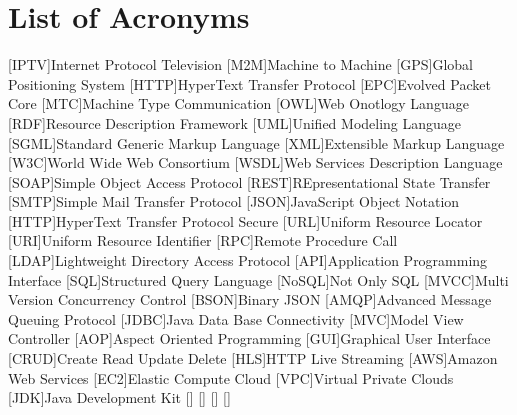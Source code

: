 \pagebreak
\section*{List of Acronyms}
\begin{acronym}
        [IPTV]{Internet Protocol Television}
        [M2M]{Machine to Machine}
        [GPS]{Global Positioning System}
        [HTTP]{HyperText Transfer Protocol}
        [EPC]{Evolved Packet Core}
        [MTC]{Machine Type Communication}
		[OWL]{Web Onotlogy Language}
		[RDF]{Resource Description Framework}
		[UML]{Unified Modeling Language}
		{Standard Generic Markup Language}
		[XML]{Extensible Markup Language}
		[W3C]{World Wide Web Consortium}
		{Web Services Description Language}
		{Simple Object Access Protocol}
		{REpresentational State Transfer}
		{Simple Mail Transfer Protocol}
		{JavaScript Object Notation}
		{HyperText Transfer Protocol Secure}
		[URL]{Uniform Resource Locator}
		[URI]{Uniform Resource Identifier}
		[RPC]{Remote Procedure Call}
		{Lightweight Directory Access Protocol}
		[API]{Application Programming Interface}
		[SQL]{Structured Query Language}
		[NoSQL]{Not Only SQL}
		{Multi Version Concurrency Control}
		{Binary JSON}
		{Advanced Message Queuing Protocol}
		{Java Data Base Connectivity}
		[MVC]{Model View Controller}
		[AOP]{Aspect Oriented Programming}
		[GUI]{Graphical User Interface}
		{Create Read Update Delete}
		[HLS]{HTTP Live Streaming}
		[AWS]{Amazon Web Services}
		[EC2]{Elastic Compute Cloud}
		[VPC]{Virtual Private Clouds}
		[JDK]{Java Development Kit}
		\acro{}[]{}
		\acro{}[]{}
		\acro{}[]{}
		\acro{}[]{}
\end{acronym}
